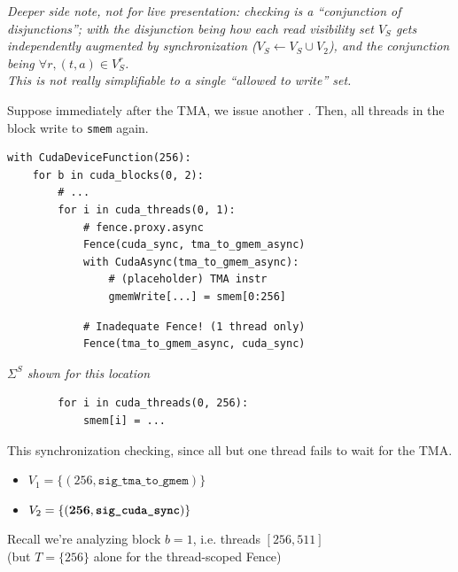 \hfill
\begin{minipage}[t]{0.7\textwidth}\fixminipage
\vspace{6mm}
\textit{Deeper side note, not for live presentation:  checking is a ``conjunction of disjunctions''; with the disjunction being how each read visibility set $V_S$ gets independently augmented by synchronization ($V_S \leftarrow V_S \cup V_2$), and the conjunction being $\forall r, (t,a) \in V_S^r$.\\
This is not really simplifiable to a single ``allowed to write'' set.}
\end{minipage}
\newpage
\begin{minipage}[t]{0.55\textwidth}\fixminipage
\vspace{-6mm}

Suppose immediately after the TMA, we issue another .
Then, all threads in the block write to \texttt{smem} again.

\begin{verbatim}
with CudaDeviceFunction(256):
    for b in cuda_blocks(0, 2):
        # ...
        for i in cuda_threads(0, 1):
            # fence.proxy.async
            Fence(cuda_sync, tma_to_gmem_async)
            with CudaAsync(tma_to_gmem_async):
                # (placeholder) TMA instr
                gmemWrite[...] = smem[0:256]
\end{verbatim}
\begin{mdframed}[style=MyFrame, backgroundcolor=violetBoxBg]
\color{violetBoxFg}
\begin{verbatim}
            # Inadequate Fence! (1 thread only)
            Fence(tma_to_gmem_async, cuda_sync)
\end{verbatim}
\end{mdframed}
\hfill\textit{$\Sigma^S$ shown for this location}
\vspace{2mm}
\begin{mdframed}[style=MyFrame, backgroundcolor=greenBoxBg]
\color{greenBoxFg}
\begin{verbatim}
        for i in cuda_threads(0, 256):
            smem[i] = ...
\end{verbatim}
\end{mdframed}

This  synchronization checking, since all but one thread fails to wait for the TMA.

\begin{itemize}
  \item $V_1 = \{(256, \texttt{sig\_tma\_to\_gmem})\}$
  \item $V_2 = \{(\mathbf{256}, \textbf{\texttt{sig\_cuda\_sync}})\}$
\end{itemize}
Recall we're analyzing block $b=1$, i.e. threads $[256, 511]$\\
(but $T = \{256\}$ alone for the thread-scoped Fence)

\end{minipage}
